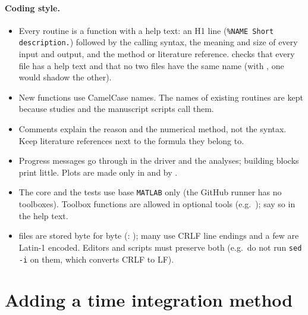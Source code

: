 \paragraph{Coding style.}
\begin{itemize}
  \item Every routine is a function with a help text: an H1 line
    (\texttt{\%NAME Short description.}) followed by the calling syntax, the
    meaning and size of every input and output, and the method or literature
    reference.  checks that every file has a help text and
    that no two files have the same name (with , one would shadow
    the other).
  \item New functions use CamelCase names. The names of existing routines are
    kept because studies and the manuscript scripts call them.
  \item Comments explain the reason and the numerical method, not the syntax.
    Keep literature references next to the formula they belong to.
  \item Progress messages go through  in
    the driver and the analyses; building blocks print little. Plots are made only
    in  and by .
  \item The core and the tests use base \texttt{MATLAB} only (the GitHub runner has no
    toolboxes). Toolbox functions are allowed in optional tools (e.g.\
    ); say so in the help text.
  \item {} files are stored byte for byte (:
    \code{-text}); many use CRLF line endings and a few are Latin-1 encoded.
    Editors and scripts must preserve both (e.g.\ do not run \texttt{sed -i} on
    them, which converts CRLF to LF).
\end{itemize}

\section{Adding a time integration method}
\label{sec:dev-integrator}

